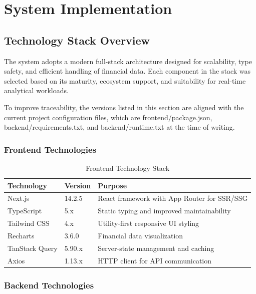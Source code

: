 \chapter{System Implementation}

\section{Technology Stack Overview}

The system adopts a modern full-stack architecture designed for scalability, type safety, and efficient handling of financial data. Each component in the stack was selected based on its maturity, ecosystem support, and suitability for real-time analytical workloads.

To improve traceability, the versions listed in this section are aligned with the current project configuration files, which are frontend/package.json, backend/requirements.txt, and backend/runtime.txt at the time of writing.

\subsection{Frontend Technologies}
\begin{table}[H]
\centering
\begin{tabular}{lll}
\toprule
\textbf{Technology} & \textbf{Version} & \textbf{Purpose} \\
\midrule
Next.js & 14.2.5 & React framework with App Router for SSR/SSG \\
TypeScript & 5.x & Static typing and improved maintainability \\
Tailwind CSS & 4.x & Utility-first responsive UI styling \\
Recharts & 3.6.0 & Financial data visualization \\
TanStack Query & 5.90.x & Server-state management and caching \\
Axios & 1.13.x & HTTP client for API communication \\
\bottomrule
\end{tabular}
\caption{Frontend Technology Stack}
\label{tab:frontend_stack}
\end{table}

\subsection{Backend Technologies}

